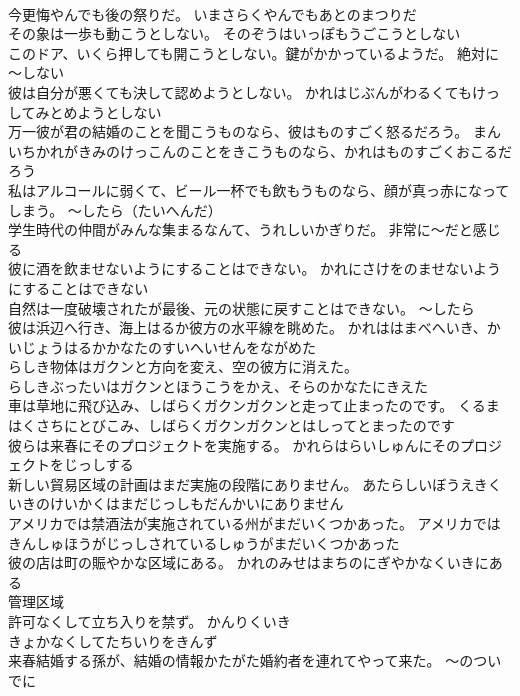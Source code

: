 \documentclass[8pt]{extreport}
\begin{document}
\begin{CJK}{UTF8}{min}
\\	今更悔やんでも後の祭りだ。	いまさらくやんでもあとのまつりだ 
\\	その象は一歩も動こうとしない。	そのぞうはいっぽもうごこうとしない 
\\	このドア、いくら押しても開こうとしない。鍵がかかっているようだ。	絶対に～しない
\\	彼は自分が悪くても決して認めようとしない。	かれはじぶんがわるくてもけっしてみとめようとしない 
\\	万一彼が君の結婚のことを聞こうものなら、彼はものすごく怒るだろう。	まんいちかれがきみのけっこんのことをきこうものなら、かれはものすごくおこるだろう 
\\	私はアルコールに弱くて、ビール一杯でも飲もうものなら、顔が真っ赤になってしまう。	～したら（たいへんだ）
\\	学生時代の仲間がみんな集まるなんて、うれしいかぎりだ。	非常に～だと感じる
\\	彼に酒を飲ませないようにすることはできない。	かれにさけをのませないようにすることはできない 
\\	自然は一度破壊されたが最後、元の状態に戻すことはできない。	～したら
\\	彼は浜辺へ行き、海上はるか彼方の水平線を眺めた。	かれははまべへいき、かいじょうはるかかなたのすいへいせんをながめた 
\\	らしき物体はガクンと方向を変え、空の彼方に消えた。	
\\	らしきぶったいはガクンとほうこうをかえ、そらのかなたにきえた 
\\	車は草地に飛び込み、しばらくガクンガクンと走って止まったのです。	くるまはくさちにとびこみ、しばらくガクンガクンとはしってとまったのです 
\\	彼らは来春にそのプロジェクトを実施する。	かれらはらいしゅんにそのプロジェクトをじっしする 
\\	新しい貿易区域の計画はまだ実施の段階にありません。	あたらしいぼうえきくいきのけいかくはまだじっしもだんかいにありません 
\\	アメリカでは禁酒法が実施されている州がまだいくつかあった。	アメリカではきんしゅほうがじっしされているしゅうがまだいくつかあった 
\\	彼の店は町の賑やかな区域にある。	かれのみせはまちのにぎやかなくいきにある 
\\	管理区域 
\\	許可なくして立ち入りを禁ず。	かんりくいき 
\\	きょかなくしてたちいりをきんず 
\\	来春結婚する孫が、結婚の情報かたがた婚約者を連れてやって来た。	～のついでに

\end{CJK}
\end{document}

